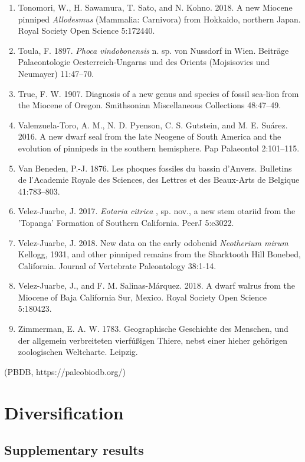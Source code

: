 \documentclass[a4paper, 12pt]{article}
\begin{document}
\begin{enumerate}
\item Tonomori, W., H. Sawamura, T. Sato, and N. Kohno. 2018. A new Miocene pinniped \textit{Allodesmus} (Mammalia: Carnivora) from Hokkaido, northern Japan. Royal Society Open Science 5:172440.
\item Toula, F. 1897. \textit{Phoca vindobonensis} n. sp. von Nussdorf in Wien. Beiträge Palaeontologie Oesterreich-Ungarns und des Orients (Mojsisovics und Neumayer) 11:47–70.
\item True, F. W. 1907. Diagnosis of a new genus and species of fossil sea-lion from the Miocene of Oregon. Smithsonian Miscellaneous Collections 48:47–49.
\item Valenzuela-Toro, A. M., N. D. Pyenson, C. S. Gutstein, and M. E. Suárez. 2016. A new dwarf seal from the late Neogene of South America and the evolution of pinnipeds in the southern hemisphere. Pap Palaeontol 2:101–115.
\item Van Beneden, P.-J. 1876. Les phoques fossiles du bassin d'Anvers. Bulletins de l'Academie Royale des Sciences, des Lettres et des Beaux-Arts de Belgique 41:783–803.
\item Velez-Juarbe, J. 2017. \textit{Eotaria citrica} , sp. nov., a new stem otariid from the 'Topanga' Formation of Southern California. PeerJ 5:e3022.
\item Velez-Juarbe, J. 2018. New data on the early odobenid \textit{Neotherium mirum} Kellogg, 1931, and other pinniped remains from the Sharktooth Hill Bonebed, California. Journal of Vertebrate Paleontology 38:1-14.
\item Velez-Juarbe, J., and F. M. Salinas-M\'{a}rquez. 2018. A dwarf walrus from the Miocene of Baja California Sur, Mexico. Royal Society Open Science 5:180423.
\item Zimmerman, E. A. W. 1783. Geographische Geschichte des Menschen, und der allgemein verbreiteten vierf\'{u}{\ss}igen Thiere, nebst einer hieher geh\"{o}rigen zoologischen Weltcharte. Leipzig.
\end{enumerate}




(PBDB, https://paleobiodb.org/)
\newpage
\section{Diversification}
\subsection{Supplementary results}
\end{document}
